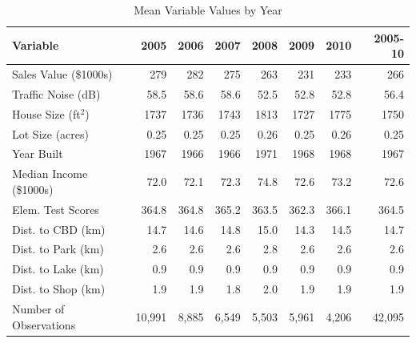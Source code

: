 \documentclass{article}\usepackage{graphicx, color}
\begin{document}
\begin{table}
\begin{center}
\caption{Mean Variable Values by Year}\label{tab:SumStatsTime}
\small
    \begin{tabular}{lrrrrrr|r}
    Variable & 2005 & 2006 & 2007 & 2008 & 2009 & 2010 & 2005-10\\ \hline
    Sales Value (\$1000s) & 279   & 282   & 275   & 263   & 231   & 233   & 266 \\
    Traffic Noise (dB) & 58.5  & 58.6  & 58.6  & 52.5  & 52.8  & 52.8  & 56.4 \\
    House Size (ft$^2$) & 1737  & 1736  & 1743  & 1813  & 1727  & 1775  & 1750 \\
    Lot Size (acres) & 0.25  & 0.25  & 0.25  & 0.26  & 0.25  & 0.26  & 0.25 \\
    Year Built  & 1967  & 1966  & 1966  & 1971  & 1968  & 1968  & 1967 \\
    Median Income (\$1000s) & 72.0  & 72.1  & 72.3  & 74.8  & 72.6  & 73.2  & 72.6 \\
    Elem. Test Scores & 364.8 & 364.8 & 365.2 & 363.5 & 362.3 & 366.1 & 364.5 \\
    Dist. to CBD (km) & 14.7  & 14.6  & 14.8  & 15.0  & 14.3  & 14.5  & 14.7 \\
    Dist. to Park (km) & 2.6   & 2.6   & 2.6   & 2.8   & 2.6   & 2.6   & 2.6 \\
    Dist. to Lake (km) & 0.9   & 0.9   & 0.9   & 0.9   & 0.9   & 0.9   & 0.9 \\
    Dist. to Shop (km) & 1.9   & 1.9   & 1.8   & 2.0   & 1.9   & 1.9   & 1.9 \\ \hline
    Number of Observations &  10,991  & 8,885  &  6,549  & 5,503  &  5,961  & 4,206  & 42,095  \\
    \end{tabular}%
\end{center}
\end{table}
\end{document}
